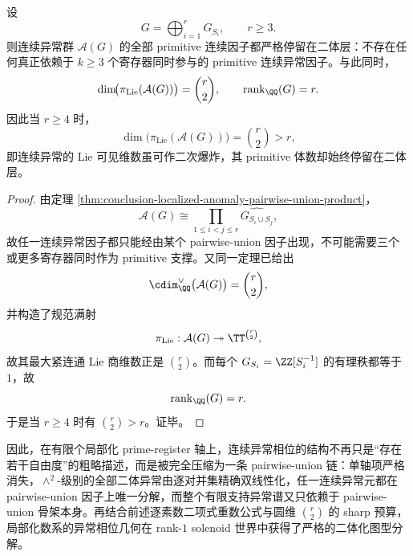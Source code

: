 \begin{corollary}[连续异常函子的严格二体化与二次维数增长]\label{cor:conclusion-localized-anomaly-strictly-pairwise-quadratic-growth}
设
\[
G=\bigoplus_{i=1}^r G_{S_i},
\qquad r\ge 3.
\]
则连续异常群 \(\mathcal A(G)\) 的全部 primitive 连续因子都严格停留在二体层：不存在任何真正依赖于 \(k\ge 3\) 个寄存器同时参与的 primitive 连续异常因子。与此同时，
\[
\dim\!\bigl(\pi_{\mathrm{Lie}}(\mathcal A(G))\bigr)=\binom r2,
\qquad
\operatorname{rank}_{\QQ}(G)=r.
\]
因此当 \(r\ge 4\) 时，
\[
\dim\!\bigl(\pi_{\mathrm{Lie}}(\mathcal A(G))\bigr)=\binom r2>r,
\]
即连续异常的 Lie 可见维数虽可作二次爆炸，其 primitive 体数却始终停留在二体层。
\end{corollary}
\begin{proof}
由定理 \ref{thm:conclusion-localized-anomaly-pairwise-union-product}，
\[
\mathcal A(G)\cong \prod_{1\le i<j\le r}\widehat{G_{S_i\cup S_j}},
\]
故任一连续异常因子都只能经由某个 pairwise-union 因子出现，不可能需要三个或更多寄存器同时作为 primitive 支撑。又同一定理已给出
\[
\cdim_{\QQ}^{\vee}\bigl(\mathcal A(G)\bigr)=\binom r2,
\]
并构造了规范满射
\[
\pi_{\mathrm{Lie}}:\mathcal A(G)\twoheadrightarrow \TT^{\binom r2},
\]
故其最大紧连通 Lie 商维数正是 \(\binom r2\)。而每个 \(G_{S_i}=\ZZ[S_i^{-1}]\) 的有理秩都等于 \(1\)，故
\[
\operatorname{rank}_{\QQ}(G)=r.
\]
于是当 \(r\ge 4\) 时有 \(\binom r2>r\)。证毕。
\end{proof}



因此，在有限个局部化 prime-register 轴上，连续异常相位的结构不再只是“存在若干自由度”的粗略描述，而是被完全压缩为一条 pairwise-union 链：单轴项严格消失，\(\wedge^2\)-级别的全部二体异常由逐对并集精确双线性化，任一连续异常元都在 pairwise-union 因子上唯一分解，而整个有限支持异常谱又只依赖于 pairwise-union 骨架本身。再结合前述逐素数二项式重数公式与圆维 \(\binom r2\) 的 sharp 预算，局部化数系的异常相位几何在 rank-\(1\) solenoid 世界中获得了严格的二体化图型分解。

\endinput
